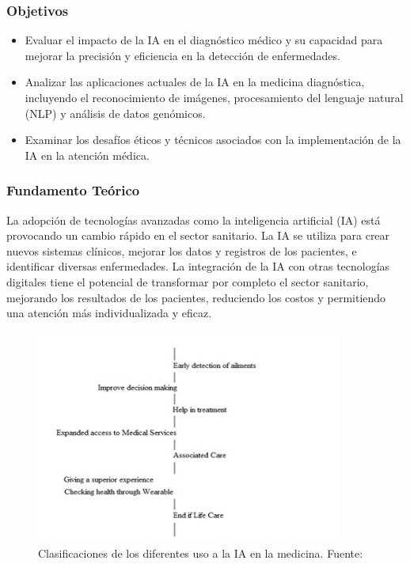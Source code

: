 \subsubsection{Objetivos}
\begin{itemize}
    \item Evaluar el impacto de la IA en el diagnóstico médico y su capacidad para mejorar la precisión y eficiencia en la detección de enfermedades.
    \item Analizar las aplicaciones actuales de la IA en la medicina diagnóstica, incluyendo el reconocimiento de imágenes, procesamiento del lenguaje natural (NLP) y análisis de datos genómicos.
    \item Examinar los desafíos éticos y técnicos asociados con la implementación de la IA en la atención médica.
\end{itemize}

\subsubsection{Fundamento Teórico}

La adopción de tecnologías avanzadas como la inteligencia artificial (IA) está provocando un cambio rápido en el sector sanitario. La IA se utiliza para crear nuevos sistemas clínicos, mejorar los datos y registros de los pacientes, e identificar diversas enfermedades. La integración de la IA con otras tecnologías digitales tiene el potencial de transformar por completo el sector sanitario, mejorando los resultados de los pacientes, reduciendo los costos y permitiendo una atención más individualizada y eficaz.
\begin{figure}[H]
    \centering
    \includegraphics[width=0.9\textwidth]{images_repo/USOSIA.jpg}
    \caption{Clasificaciones de los diferentes uso a la IA en la medicina. Fuente: \cite{santhoshkumar2023}}
    \label{Clasificaciones de los diferentes uso a la IA en la medicina}
\end{figure}


